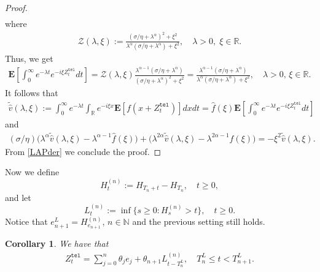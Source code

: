 \documentclass[10pt,a4paper]{article}
\numberwithin{equation}{section}
\theoremstyle{plain}
\newtheorem{corollary}{Corollary}
\theoremstyle{remark}
\begin{document}
\begin{proof}
\begin{align*}
\end{align*}
where
\begin{align*}
\mathcal{Z}(\lambda, \xi) :=\frac{(\sigma/\eta + \lambda^\alpha)^2 + \xi^2}{\lambda^\alpha (\sigma/\eta + \lambda^\alpha) + \xi^2}, \quad \lambda>0,\; \xi \in \mathbb{R}.
\end{align*}
Thus, we get
\begin{align}
\mathbf{E} \left[\int_0^\infty e^{-\lambda t} e^{-i\xi Z^\mathtt{tel}_t} dt \right]= \mathcal{Z}(\lambda, \xi) \frac{\lambda^{\alpha -1} (\sigma/\eta + \lambda^\alpha)}{(\sigma/\eta + \lambda^\alpha)^2 + \xi^2} = \frac{\lambda^{\alpha -1} (\sigma/\eta + \lambda^\alpha)}{\lambda^\alpha (\sigma/\eta + \lambda^\alpha) + \xi^2}, \quad \lambda >0,\, \xi \in \mathbb{R}.
\label{ZteldoubleTransform}
\end{align}
It follows that
\begin{align*}
\tilde{\hat{v}}(\lambda, \xi) := \int_0^\infty e^{-\lambda t} \int_\mathbb{R} e^{-i\xi x} \mathbf{E}[f(x + Z_t^\mathtt{tel})]dx dt = \hat{f}(\xi) \mathbf{E}\left[ \int_0^\infty e^{-\lambda t} e^{-i \xi Z_t^\mathtt{tel}} dt \right]
\end{align*}
and
\begin{align*}
(\sigma/\eta) \big( \lambda^\alpha \tilde{\hat{v}}(\lambda, \xi) - \lambda^{\alpha-1} \hat{f}(\xi) \big) + \big(\lambda^{2\alpha} \tilde{\hat{v}}(\lambda, \xi) - \lambda^{2\alpha - 1} \hat{f}(\xi) \big) = - \xi^2 \tilde{\hat{v}}(\lambda, \xi).
\end{align*}
From \eqref{LAPder} we conclude the proof.
\end{proof}





Now we define
	\begin{equation}
		H_t^{(n)}:=H_{T_n+t}-H_{T_n},\quad t\ge0,
		\label{shiftH}
	\end{equation}
	and let
	\begin{equation}
		L_t^{(n)}:=\inf\{s\ge0:H_s^{(n)}>t\},\quad t\ge0.
		\label{shiftL}
	\end{equation}
	Notice that $e^L_{n+1} = H_{e_{n+1}}^{(n)}$, $n \in \mathbb{N}$ and the previous setting still holds. 

\begin{corollary}
We have that
\begin{align*}
Z_t^{\mathtt{tel}} = \sum_{j=0}^n\theta_j e_j + \theta_{n+1}L_{t-T_n^L}^{(n)}, \quad T_n^L\le t<T_{n+1}^L.
		\label{defZtel}
\end{align*}
\end{corollary}
\end{document}
